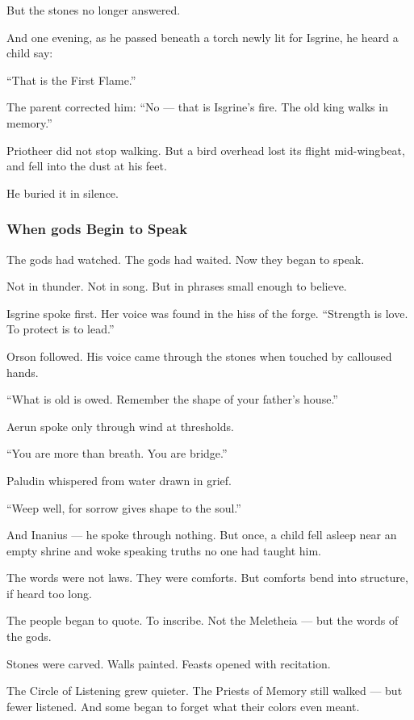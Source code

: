 \documentclass[12pt]{article}
\begin{document}
But the stones no longer answered.

And one evening, as he passed beneath a torch newly lit for Isgrine,  
he heard a child say:

 “That is the First Flame.”

The parent corrected him:  
 “No — that is Isgrine’s fire. The old king walks in memory.”

Priotheer did not stop walking.  
But a bird overhead lost its flight mid-wingbeat,  
and fell into the dust at his feet.

He buried it in silence.

\dotfill

\subsubsection*{When gods Begin to Speak}

The gods had watched.  
The gods had waited.  
Now they began to speak.

Not in thunder. Not in song.  
But in phrases small enough to believe.

Isgrine spoke first.  
Her voice was found in the hiss of the forge.  
 “Strength is love. To protect is to lead.”

Orson followed.  
His voice came through the stones when touched by calloused hands. 

 “What is old is owed. Remember the shape of your father’s house.”

Aerun spoke only through wind at thresholds.  

 “You are more than breath. You are bridge.”

Paludin whispered from water drawn in grief.

 “Weep well, for sorrow gives shape to the soul.”

And Inanius —  
he spoke through nothing.  
But once, a child fell asleep near an empty shrine and woke speaking truths no one had taught him.

The words were not laws.  
They were comforts.  
But comforts bend into structure, if heard too long.

The people began to quote.  
To inscribe.  
Not the Meletheia — but the words of the gods.

Stones were carved.  
Walls painted.  
Feasts opened with recitation.

The Circle of Listening grew quieter.  
The Priests of Memory still walked —  
but fewer listened.  
And some began to forget what their colors even meant.
\end{document}
